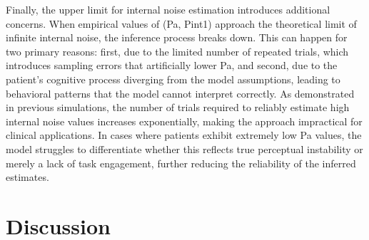 Finally, the upper limit for internal noise estimation introduces additional concerns. When empirical values of (Pa, Pint1) approach the theoretical limit of infinite internal noise, the inference process breaks down. This can happen for two primary reasons: first, due to the limited number of repeated trials, which introduces sampling errors that artificially lower Pa, and second, due to the patient’s cognitive process diverging from the model assumptions, leading to behavioral patterns that the model cannot interpret correctly. As demonstrated in previous simulations, the number of trials required to reliably estimate high internal noise values increases exponentially, making the approach impractical for clinical applications. In cases where patients exhibit extremely low Pa values, the model struggles to differentiate whether this reflects true perceptual instability or merely a lack of task engagement, further reducing the reliability of the inferred estimates.


\section {Discussion} 
